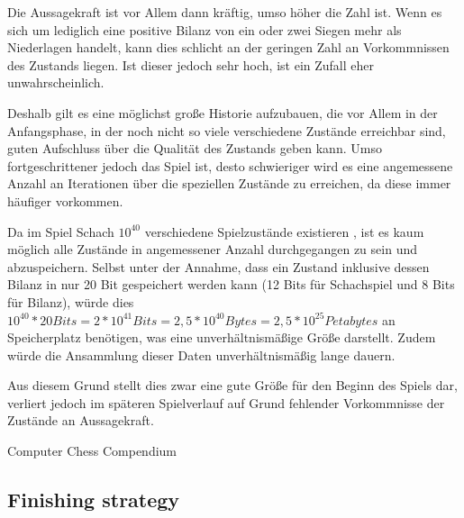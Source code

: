 Die Aussagekraft ist vor Allem dann kräftig, umso höher die Zahl ist. Wenn es sich um lediglich eine positive Bilanz von ein oder zwei Siegen mehr als Niederlagen handelt, kann dies schlicht an der geringen Zahl an Vorkommnissen des Zustands liegen. Ist dieser jedoch sehr hoch, ist ein Zufall eher unwahrscheinlich.

Deshalb gilt es eine möglichst große Historie aufzubauen, die vor Allem in der Anfangsphase, in der noch nicht so viele verschiedene Zustände erreichbar sind, guten Aufschluss über die Qualität des Zustands geben kann. Umso fortgeschrittener jedoch das Spiel ist, desto schwieriger wird es eine angemessene Anzahl an Iterationen über die speziellen Zustände zu erreichen, da diese immer häufiger vorkommen.

Da im Spiel Schach $10^40$ verschiedene Spielzustände existieren \cite{Stroetmann2018} , ist es kaum möglich alle Zustände in angemessener Anzahl durchgegangen zu sein und abzuspeichern. Selbst unter der Annahme, dass ein Zustand inklusive dessen Bilanz in nur 20 Bit gespeichert werden kann (12 Bits für Schachspiel \cite{Speight} und 8 Bits für Bilanz), würde dies $10^40 * 20 Bits = 2 * 10^41 Bits = 2,5 * 10^40 Bytes = 2,5 * 10^25 Petabytes$ an Speicherplatz benötigen, was eine unverhältnismäßige Größe darstellt. Zudem würde die Ansammlung dieser Daten unverhältnismäßig lange dauern.


Aus diesem Grund stellt dies zwar eine gute Größe für den Beginn des Spiels dar, verliert jedoch im späteren Spielverlauf auf Grund fehlender Vorkommnisse der Zustände an Aussagekraft.

Computer Chess Compendium

\subsection{Finishing strategy}\label{finishing_evaluation}